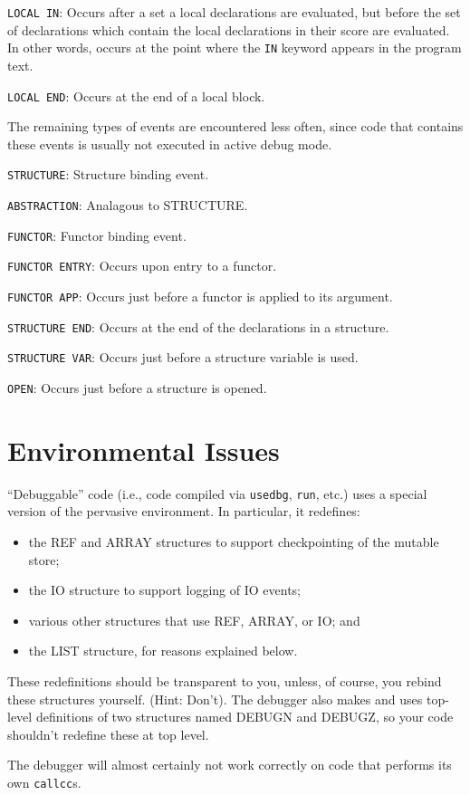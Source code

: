 \verb'LOCAL IN': Occurs after a set a local declarations are evaluated,
but before the set of declarations which contain the local
declarations in their score are evaluated.  In other words, occurs at
the point where the \verb'IN' keyword appears in the program text.

\verb'LOCAL END': Occurs at the end of a local block.

The remaining types of events are encountered less often, since code
that contains these events is usually not executed in active debug mode.

\verb'STRUCTURE': Structure binding event.

\verb'ABSTRACTION': Analagous to STRUCTURE.

\verb'FUNCTOR': Functor binding event.

\verb'FUNCTOR ENTRY': Occurs upon entry to a functor.

\verb'FUNCTOR APP': Occurs just before a functor is applied to its
argument.

\verb'STRUCTURE END': Occurs at the end of the declarations in a
structure.

\verb'STRUCTURE VAR': Occurs just before a structure variable is used.

\verb'OPEN': Occurs just before a structure is opened.

\section{Environmental Issues}
``Debuggable'' code (i.e., code compiled via  \verb'usedbg', \verb'run', etc.)
uses a special version of the pervasive environment.  In particular, it 
redefines:
\begin{itemize}
\item the REF and ARRAY structures to support checkpointing of the mutable
store;
\item the IO structure to support logging of IO events;
\item various other structures that use REF, ARRAY, or IO; and
\item the LIST structure, for reasons explained below.
\end{itemize}
These redefinitions should be transparent to you, unless, of course, you
rebind these structures yourself. (Hint: Don't).  The debugger also makes
and uses top-level definitions of two structures named DEBUGN and DEBUGZ,
so your code shouldn't redefine these at top level.

The debugger will almost certainly not work correctly on code that performs its
own \verb'callcc's.

